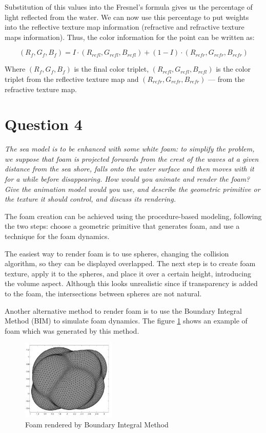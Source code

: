 \documentclass{report}
\begin{document}
Substitution of this values into the Fresnel's formula gives us the
percentage of light reflected from the water. We can now use this
percentage to put weights into the reflective texture map information
(refractive and refractive texture maps information). Thus, the color
information for the point can be written as:

\begin{equation}
  (R_f,G_f,B_f) = I\cdot(R_{refl},G_{refl},B_{refl}) +
  (1-I)\cdot(R_{refr},G_{refr},B_{refr})
\end{equation}

Where $(R_f,G_f,B_f)$ is the final color triplet,
$(R_{refl},G_{refl},B_{refl})$ is the color triplet from the reflective
texture map and $(R_{refr},G_{refr},B_{refr})$ --- from the refractive
texture map. 

\section{Question 4}

\emph{The sea model is to be enhanced with some white foam: to simplify
the problem, we suppose that foam is projected forwards from the crest
of the waves at a given distance from the sea shore, falls onto the
water surface and then moves with it for a while before disappearing.
How would you animate and render the foam? Give the animation model
would you use, and describe the geometric primitive or the texture it
should control, and discuss its rendering.}

The foam creation can be achieved using the procedure-based modeling, following the two steps: choose a geometric primitive that generates foam, and use a technique for the foam dynamics.

The easiest way to render foam is to use spheres, changing the collision
algorithm, so they can be displayed overlapped. The next step is to create foam
texture, apply it to the spheres, and place it over a certain height,
introducing the volume aspect.  Although this looks unrealistic since if 
transparency is added to the foam, the intersections between spheres are not natural. 

Another alternative method to render foam is to use the Boundary Integral Method (BIM) to simulate foam dynamics\cite{bim}. The figure \ref{fig:dim-foam} shows an example of foam which was generated by this method.

\begin{figure}[H] \centering
  \includegraphics[width=0.4\textwidth]{image/dim01.png} \caption{Foam
  rendered by Boundary Integral Method} \label{fig:dim-foam}
\end{figure}
\end{document}
